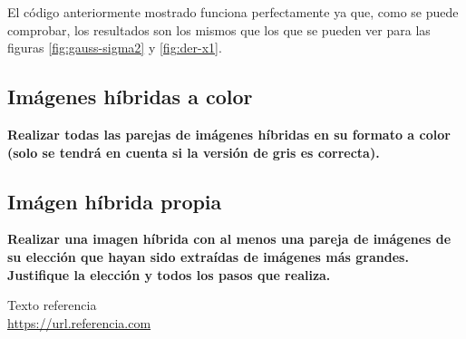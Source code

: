 \documentclass[11pt,a4paper]{article}
\begin{document}
El código anteriormente mostrado funciona perfectamente ya que, como se puede comprobar, los resultados son los mismos que los
que se pueden ver para las figuras \ref{fig:gauss-sigma2} y \ref{fig:der-x1}.

\subsection{Imágenes híbridas a color}

\noindent \textbf{Realizar todas las parejas de imágenes híbridas en su formato a color (solo se tendrá en cuenta
si la versión de gris es correcta).}

\subsection{Imágen híbrida propia}

\noindent \textbf{Realizar una imagen híbrida con al menos una pareja de imágenes de su elección que hayan
sido extraídas de imágenes más grandes. Justifique la elección y todos los pasos que realiza.}

\newpage

\begin{thebibliography}{5}

Texto referencia
\\\url{https://url.referencia.com}

\end{thebibliography}
\end{document}
